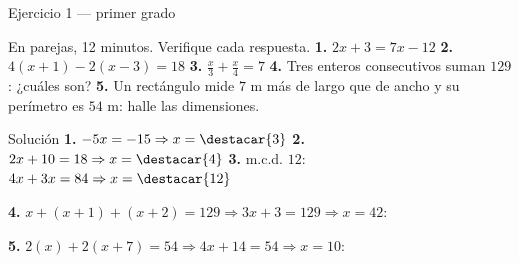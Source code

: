 \documentclass[aspectratio=169,10pt]{beamer}
\begin{document}
\begin{frame}{Ejercicio 1 — primer grado}
  \scriptsize
  \begin{alertblock}{En parejas, 12 minutos. Verifique cada respuesta.}
    \tiny
    \textbf{1.} $2x+3 = 7x-12$ \qquad
    \textbf{2.} $4(x+1)-2(x-3) = 18$ \qquad
    \textbf{3.} $\tfrac{x}{3}+\tfrac{x}{4} = 7$ \qquad
    \textbf{4.} Tres enteros consecutivos suman $129$: ¿cuáles son? \qquad
    \textbf{5.} Un rectángulo mide $7$ m más de largo que de ancho y su
    perímetro es $54$ m: halle las dimensiones.
  \end{alertblock}

  \vspace{0.05cm}
  \begin{block}{Solución}
    \tiny
    \textbf{1.} $-5x=-15 \Rightarrow x=\destacar{3}$ \qquad
    \textbf{2.} $2x+10=18 \Rightarrow x=\destacar{4}$ \qquad
    \textbf{3.} m.c.d. $12$: $4x+3x=84 \Rightarrow x=\destacar{12}$

    \vspace{0.08cm}
    \textbf{4.} $x+(x+1)+(x+2)=129 \Rightarrow 3x+3=129
    \Rightarrow x=42$: 

    \vspace{0.08cm}
    \textbf{5.} $2(x)+2(x+7)=54 \Rightarrow 4x+14=54
    \Rightarrow x=10$: 
  \end{block}
\end{frame}

\end{document}
